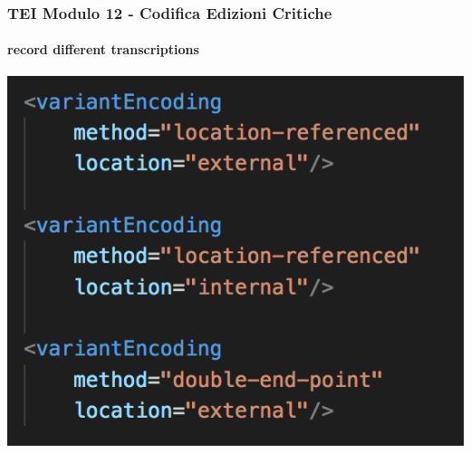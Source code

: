 \begin{frame}
    \frametitle{TEI Modulo 12 - Codifica Edizioni Critiche}
    \framesubtitle{record different transcriptions}
    \addtocounter{nframe}{1}
    

    \begin{center}
       \includegraphics[width=.95\textwidth]{imgs/variantEncoding.png}
    \end{center}

\end{frame}









